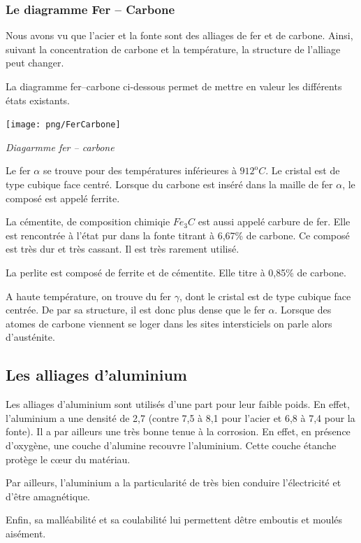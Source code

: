 \documentclass[11pt,oneside]{article}
\begin{document}
\subsubsection{Le diagramme Fer -- Carbone}
Nous avons vu que l'acier et la fonte sont des alliages de fer et de carbone. Ainsi, suivant la concentration de carbone et la température, la structure de l'alliage peut changer. 

La diagramme fer--carbone ci-dessous permet de mettre en valeur les différents états existants. 
\begin{center}
\texttt{[image: png/FerCarbone]}

\textit{Diagarmme fer -- carbone \cite{fer}}
\end{center}

Le fer $\alpha$ se trouve pour des températures inférieures à $912^\text{o}C$. Le cristal est de type cubique face centré. Lorsque du carbone est inséré dans la maille de fer $\alpha$, le composé est appelé ferrite. 

La cémentite, de composition chimiqie $Fe_3 C$ est aussi appelé carbure de fer. Elle est rencontrée à l'état pur dans la fonte titrant à 6,67\% de carbone. Ce composé est très dur et très cassant. Il est très rarement utilisé. 

La perlite est composé de ferrite et de cémentite. Elle titre à 0,85\% de carbone. 

A haute température, on trouve du fer $\gamma$, dont le cristal est de type cubique face centrée. De par sa structure, il est donc plus dense que le fer $\alpha$. Lorsque des atomes de carbone viennent se loger dans les sites intersticiels on parle alors d'austénite. 

\subsection{Les alliages d'aluminium}

Les alliages d'aluminium sont utilisés d'une part pour leur faible poids. En effet, l'aluminium a une densité de 2,7 (contre 7,5 à 8,1 pour l'acier et 6,8 à 7,4 pour la fonte). Il a par ailleurs une très bonne tenue à la corrosion. En effet, en présence d'oxygène, une couche d'alumine recouvre l'aluminium. Cette couche étanche protège le c\oe{}ur du matériau. 

Par ailleurs, l'aluminium a la particularité de très bien conduire l'électricité et d'être amagnétique. 

Enfin, sa malléabilité et sa coulabilité lui permettent dêtre emboutis et moulés aisément. 
\end{document}
